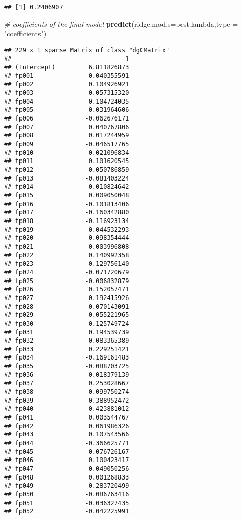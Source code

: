 \documentclass[]{article}
\newenvironment{Shaded}{\begin{snugshade}}{\end{snugshade}}
\newcommand{\CommentTok}[1]{\textcolor[rgb]{0.56,0.35,0.01}{\textit{#1}}}
\newcommand{\DataTypeTok}[1]{\textcolor[rgb]{0.13,0.29,0.53}{#1}}
\newcommand{\KeywordTok}[1]{\textcolor[rgb]{0.13,0.29,0.53}{\textbf{#1}}}
\newcommand{\NormalTok}[1]{#1}
\newcommand{\StringTok}[1]{\textcolor[rgb]{0.31,0.60,0.02}{#1}}
\begin{document}
\begin{verbatim}
## [1] 0.2406907
\end{verbatim}

\begin{Shaded}
\begin{Highlighting}[]
\CommentTok{# coefficients of the final model}
\KeywordTok{predict}\NormalTok{(ridge.mod,}\DataTypeTok{s=}\NormalTok{best.lambda,}\DataTypeTok{type =} \StringTok{"coefficients"}\NormalTok{)}
\end{Highlighting}
\end{Shaded}

\begin{verbatim}
## 229 x 1 sparse Matrix of class "dgCMatrix"
##                               1
## (Intercept)         6.811826873
## fp001               0.040355591
## fp002               0.104926921
## fp003              -0.057315320
## fp004              -0.104724035
## fp005              -0.031964606
## fp006              -0.062676171
## fp007               0.040767806
## fp008               0.017244959
## fp009              -0.046517765
## fp010               0.021096834
## fp011               0.101620545
## fp012              -0.050786859
## fp013              -0.081403224
## fp014              -0.010824642
## fp015               0.009050048
## fp016              -0.101813406
## fp017              -0.160342880
## fp018              -0.116923134
## fp019               0.044532293
## fp020               0.098354444
## fp021              -0.003996808
## fp022               0.140992358
## fp023              -0.129756140
## fp024              -0.071720679
## fp025              -0.006832879
## fp026               0.152057471
## fp027               0.192415926
## fp028               0.070143091
## fp029              -0.055221965
## fp030              -0.125749724
## fp031               0.194539739
## fp032              -0.083365389
## fp033               0.229251421
## fp034              -0.169161483
## fp035              -0.088703725
## fp036              -0.018379139
## fp037               0.253028667
## fp038               0.099750274
## fp039              -0.388952472
## fp040               0.423881012
## fp041               0.003544767
## fp042               0.061986326
## fp043               0.107543566
## fp044              -0.366625771
## fp045               0.076726167
## fp046               0.100423417
## fp047              -0.049050256
## fp048               0.001268833
## fp049               0.283720499
## fp050              -0.086763416
## fp051              -0.036327435
## fp052              -0.042225991

\end{verbatim}
\end{document}
